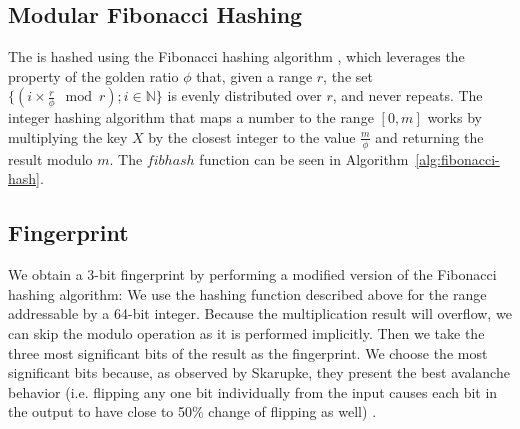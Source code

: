 \subsection{Modular Fibonacci Hashing}\label{sec:fibhash}


The \kmer is hashed using the Fibonacci hashing algorithm \cite{Skarupke2018}, which leverages the property of the golden ratio $\phi$ that, given a range $r$, the set $\{(i \times \frac{r}{\phi} \mod r) ; i \in \mathbb{N}\}$ is evenly distributed over $r$, and never repeats. The integer hashing algorithm that maps a number to the range $[0, m]$ works by multiplying the key $X$ by the closest integer to the value $\frac{m}{\phi}$ and returning the result modulo $m$. The $\mathit{fibhash}$ function can be seen in Algorithm~\ref{alg:fibonacci-hash}.

\begin{algorithm}
  \caption{$\mathit{fibhash}(X, m)$}\label{alg:fibonacci-hash}
\end{algorithm}

\subsection{Fingerprint}\label{sec:fingerprint}

We obtain a 3-bit fingerprint by performing a modified version of the Fibonacci hashing algorithm: We use the hashing function described above for the range addressable by a 64-bit integer. Because the multiplication result will overflow, we can skip the modulo operation as it is performed implicitly. Then we take the three most significant bits of the result as the fingerprint. We choose the most significant bits because, as observed by Skarupke, they present the best avalanche behavior (i.e. flipping any one bit individually from the input causes each bit in the output to have close to 50\% change of flipping as well) \cite{Skarupke2018}.

